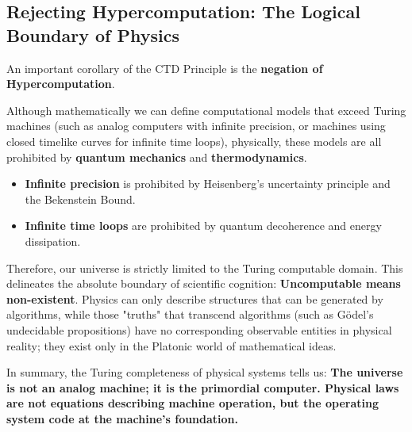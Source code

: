 \subsection{Rejecting Hypercomputation: The Logical Boundary of Physics}

An important corollary of the CTD Principle is the \textbf{negation of Hypercomputation}.

Although mathematically we can define computational models that exceed Turing machines (such as analog computers with infinite precision, or machines using closed timelike curves for infinite time loops), physically, these models are all prohibited by \textbf{quantum mechanics} and \textbf{thermodynamics}.

\begin{itemize}
\item \textbf{Infinite precision} is prohibited by Heisenberg's uncertainty principle and the Bekenstein Bound.

\item \textbf{Infinite time loops} are prohibited by quantum decoherence and energy dissipation.
\end{itemize}

Therefore, our universe is strictly limited to the Turing computable domain. This delineates the absolute boundary of scientific cognition: \textbf{Uncomputable means non-existent}. Physics can only describe structures that can be generated by algorithms, while those "truths" that transcend algorithms (such as Gödel's undecidable propositions) have no corresponding observable entities in physical reality; they exist only in the Platonic world of mathematical ideas.

In summary, the Turing completeness of physical systems tells us: \textbf{The universe is not an analog machine; it is the primordial computer. Physical laws are not equations describing machine operation, but the operating system code at the machine's foundation.}
